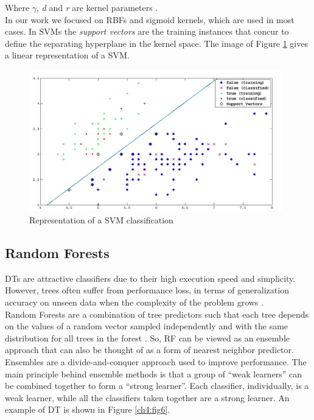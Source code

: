 Where $\gamma$, \textit{d} and \textit{r} are kernel parameters \cite{ML01}.\\
In our work we focused on \Glspl{RBF} and sigmoid kernels, which are used in most cases.
In \Glspl{SVM} the \textit{support vectors} are the training instances that concur to define the separating hyperplane in the kernel space. The 
image of Figure \ref{ch4:fig5} gives a linear representation of a \Gls{SVM}.

\begin{figure}[!hbt]
  \centering
    \includegraphics[width=0.98\textwidth]{./images/SVM_example_mod1.png}
  \caption{Representation of a SVM classification}
  \label{ch4:fig5}
\end{figure}


\vspace{0.5cm}

\subsection{Random Forests}

\Glspl{DT} are attractive classifiers due to their high execution speed and simplicity. However, trees often suffer from performance loss, in terms
of generalization accuracy on unseen data when the complexity of the problem grows \cite{randForests01}.\\
Random Forests are a combination of tree predictors such that each tree depends on the values of a
random vector sampled independently and with the same distribution for all trees in the forest \cite{randForests03}.
So, \Gls{RF} can be viewed as an ensemble approach that can also be thought of as a form of nearest neighbor predictor.
Ensembles are a divide-and-conquer approach used to improve performance. The main principle behind ensemble methods is that a group of \textquotedblleft weak learners\textquotedblright
can be combined together to form a \textquotedblleft strong learner\textquotedblright. Each classifier, individually, is a weak learner, while all the classifiers taken together are a strong learner.
An example of \Gls{DT} is shown in Figure \ref{ch4:fig6}.

